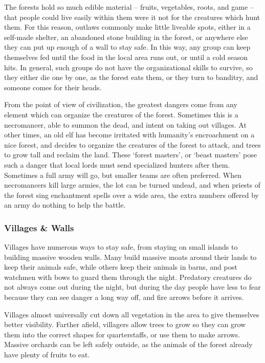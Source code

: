 \begin{multicols}{2}
The forests hold so much edible material -- fruits, vegetables, roots, and game -- that people could live easily within them were it not for the creatures which hunt them.
For this reason, outlaws commonly make little liveable spots, either in a self-made shelter, an abandoned stone building in the forest, or anywhere else they can put up enough of a wall to stay safe.
In this way, any group can keep themselves fed until the food in the local area runs out, or until a cold season hits.
In general, such groups do not have the organizational skills to survive, so they either die one by one, as the forest eats them, or they turn to banditry, and someone comes for their heads.

From the point of view of civilization, the greatest dangers come from any element which can organize the creatures of the forest.
Sometimes this is a necromancer, able to summon the dead, and intent on taking out villages.
At other times, an old elf has become irritated with humanity's encroachment on a nice forest, and decides to organize the creatures of the forest to attack, and trees to grow tall and reclaim the land.
These `forest masters', or `beast masters' pose such a danger that local lords must send specialized hunters after them.
Sometimes a full army will go, but smaller teams are often preferred.
When necromancers kill large armies, the lot can be turned undead, and when priests of the forest sing enchantment spells over a wide area, the extra numbers offered by an army do nothing to help the battle.

\subsubsection{Villages \& Walls}

Villages have numerous ways to stay safe, from staying on small islands to building massive wooden walls.
Many build massive moats around their lands to keep their animals safe, while others keep their animals in barns, and post watchmen with bows to guard them through the night.
Predatory creatures do not always come out during the night, but during the day people have less to fear because they can see danger a long way off, and fire arrows before it arrives.

Villages almost universally cut down all vegetation in the area to give themselves better visibility.
Farther afield, villagers allow trees to grow so they can grow them into the correct shapes for quarterstaffs, or use them to make arrows.
Massive orchards can be left safely outside, as the animals of the forest already have plenty of fruits to eat.


\end{multicols}
